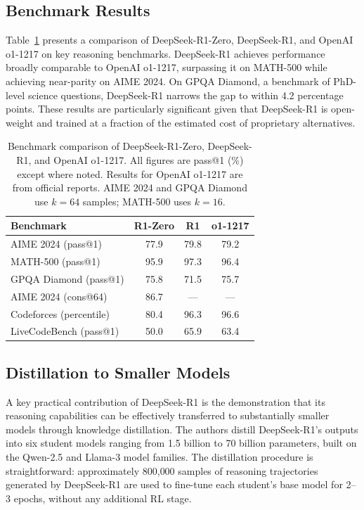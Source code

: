 \subsection{Benchmark Results}

Table~\ref{tab:deepseek-r1-results} presents a comparison of DeepSeek-R1-Zero,
DeepSeek-R1, and OpenAI o1-1217 on key reasoning benchmarks. DeepSeek-R1 achieves
performance broadly comparable to OpenAI o1-1217, surpassing it on MATH-500 while
achieving near-parity on AIME 2024. On GPQA Diamond, a benchmark of PhD-level science
questions, DeepSeek-R1 narrows the gap to within 4.2 percentage points. These results
are particularly significant given that DeepSeek-R1 is open-weight and trained at a
fraction of the estimated cost of proprietary alternatives.

\begin{table}[ht]
\centering
\caption{Benchmark comparison of DeepSeek-R1-Zero, DeepSeek-R1, and OpenAI o1-1217.
All figures are pass@1 (\%) except where noted. Results for OpenAI o1-1217 are from
official reports. AIME 2024 and GPQA Diamond use $k{=}64$ samples; MATH-500 uses
$k{=}16$.}
\label{tab:deepseek-r1-results}
\small
\begin{tabular}{@{}p{}ccc@{}}
\toprule
\textbf{Benchmark} & \textbf{R1-Zero} & \textbf{R1} & \textbf{o1-1217} \\
\midrule
AIME 2024 (pass@1)       & 77.9  & 79.8  & 79.2 \\
MATH-500 (pass@1)        & 95.9  & 97.3  & 96.4 \\
GPQA Diamond (pass@1)    & 75.8  & 71.5  & 75.7 \\
\midrule
AIME 2024 (cons@64)      & 86.7  & ---   & ---  \\
Codeforces (percentile)  & 80.4  & 96.3  & 96.6 \\
LiveCodeBench (pass@1)   & 50.0  & 65.9  & 63.4 \\
\bottomrule
\end{tabular}
\end{table}

\subsection{Distillation to Smaller Models}

A key practical contribution of DeepSeek-R1 is the demonstration that its reasoning
capabilities can be effectively transferred to substantially smaller models through
knowledge distillation. The authors distill DeepSeek-R1's outputs into six student
models ranging from 1.5 billion to 70 billion parameters, built on the Qwen-2.5 and
Llama-3 model families. The distillation procedure is straightforward: approximately
800{,}000 samples of reasoning trajectories generated by DeepSeek-R1 are used to
fine-tune each student's base model for 2--3 epochs, without any additional RL stage.

